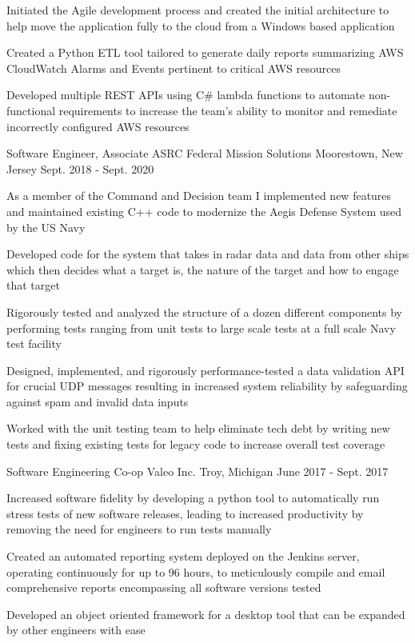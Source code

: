 \begin{cventries}
{\begin{cvitems}
        \item {Initiated the Agile development process and created the initial architecture to help move the application fully to the cloud from a Windows based application}
        \item {Created a Python ETL tool tailored to generate daily reports summarizing AWS CloudWatch Alarms and Events pertinent to critical AWS resources}
        \item {Developed multiple REST APIs using C\# lambda functions to automate non-functional requirements to increase the team's ability to monitor and remediate incorrectly configured AWS resources}
      \end{cvitems} 
    }  
  \cventry
    {Software Engineer, Associate}
    {ASRC Federal Mission Solutions}
    {Moorestown, New Jersey}
    {Sept. 2018 - Sept. 2020}
    {
      \begin{cvitems}
        \item {As a member of the Command and Decision team I implemented new features and maintained existing C++ code to modernize the Aegis Defense System used by the US Navy}
        \item {Developed code for the system that takes in radar data and data from other ships which then decides what a target is, the nature of the target and how to engage that target}
        \item {Rigorously tested and analyzed the structure of a dozen different components by performing tests ranging from unit tests to large scale tests at a full scale Navy test facility}
        \item {Designed, implemented, and rigorously performance-tested a data validation API for crucial UDP messages resulting in increased system reliability by safeguarding against spam and invalid data inputs}
        \item {Worked with the unit testing team to help eliminate tech debt by writing new tests and fixing existing tests for legacy code to increase overall test coverage}
      \end{cvitems} 
    }  
  \cventry
    {Software Engineering Co-op}
    {Valeo Inc.}
    {Troy, Michigan}
    {June 2017 - Sept. 2017}
    {
      \begin{cvitems}
        \item {Increased software fidelity by developing a python tool to automatically run stress tests of new software releases, leading to increased productivity by removing the need for engineers to run tests manually}
        \item {Created an automated reporting system deployed on the Jenkins server, operating continuously for up to 96 hours, to meticulously compile and email comprehensive reports encompassing all software versions tested}
        \item {Developed an object oriented framework for a desktop tool that can be expanded by other engineers with ease}
      \end{cvitems}
    }
\end{cventries}
